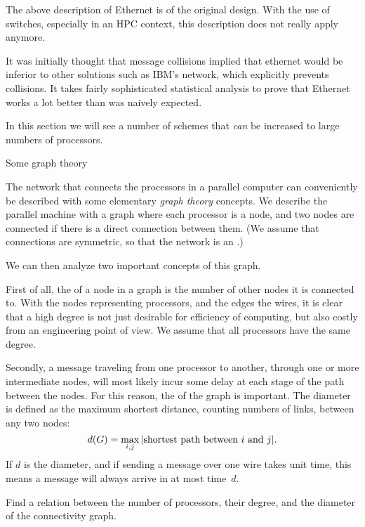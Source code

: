 \begin{remark}
The above description of Ethernet is of the original design. With the
use of switches, especially in an HPC context, this description does
not really apply anymore.

It was initially thought that message collisions implied that
ethernet would be inferior to other
solutions such as IBM's  network,
which explicitly prevents collisions.
It takes fairly sophisticated statistical analysis to prove that
Ethernet works a lot better than was naively expected.
\end{remark}

In this section we will see a number of schemes that \emph{can} be
increased to large numbers of processors.

 {Some graph theory}
\label{sec:graph-theory}

The network that connects the processors in a parallel computer can
conveniently be described with some elementary \emph{graph
  theory} concepts. We
describe the parallel machine with a graph where each processor is a
node, and two nodes are connected if there is a direct connection
between them. (We assume that connections
  are symmetric, so that the network is an
  .)

We can then analyze two
important concepts of this graph.

First of all, the  of a node in a graph is the
number of other nodes it is connected to. With the nodes representing
processors, and the edges the wires, it is clear that a high degree
is not just desirable for efficiency of computing, but also costly
from an engineering point of view. We assume that all processors have
the same degree.

Secondly, a message traveling from one processor to another, through
one or more intermediate nodes, will most likely incur some delay at each
stage of the path between the nodes.
For this reason, the  of the
graph is important. The diameter is defined as the maximum shortest
distance, counting numbers of links, between any two nodes:
\[ d(G) = \max_{i,j}|\hbox{shortest path between $i$ and $j$}|. \]
If $d$ is the diameter,
and if sending a message over one wire takes unit time,
this means a message will always arrive in at most time~$d$.

\begin{exercise}
  \label{ex:p-d-D-relation}
  Find a relation between the number of processors, their degree,
  and the diameter of the connectivity graph.
\end{exercise}

